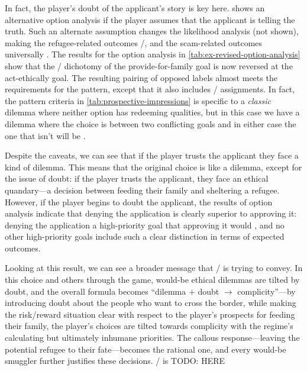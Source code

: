 In fact, the player's doubt of the applicant's story is key here.
%
 shows an alternative option analysis if the player assumes that the applicant is telling the truth.
%
Such an alternate assumption changes the likelihood analysis (not shown), making the refugee-related outcomes /, and the scam-related outcomes universally .
%
The results for the option analysis in \cref{tab:ex-revised-option-analysis} show that the / dichotomy of the provide-for-family goal is now reversed at the act-ethically goal.
%
The resulting pairing of opposed  labels almost meets the requirements for the  pattern, except that it also includes / assignments.
%
In fact, the  pattern criteria in \cref{tab:prospective-impressions} is specific to a \emph{classic} dilemma where neither option has redeeming qualities, but in this case we have a dilemma where the choice is between two conflicting goals and in either case the one that isn't  will be .


Despite the caveats, we can see that if the player trusts the applicant they face a kind of dilemma.
%
This means that the original choice is like a dilemma, except for the issue of doubt: if the player trusts the applicant, they face an ethical quandary---a decision between feeding their family and sheltering a refugee.
%
However, if the player begins to doubt the applicant, the results of option analysis indicate that denying the application is clearly superior to approving it: denying the application  a high-priority goal that approving it would , and no other high-priority goals include such a clear distinction in terms of expected outcomes.


Looking at this result, we can see a broader message that \papersplease/ is trying to convey.
%
In this choice and others through the game, would-be ethical dilemmas are tilted by doubt, and the overall formula becomes ``dilemma $+$ doubt $\rightarrow$ complicity''---by introducing doubt about the people who want to cross the border, while making the risk/reward situation clear with respect to the player's prospects for feeding their family, the player's choices are tilted towards complicity with the regime's calculating but ultimately inhumane priorities.
%
The callous response---leaving the potential refugee to their fate---becomes the rational one, and every would-be smuggler further justifies these decisions.
%
\papersplease/ is TODO: HERE


